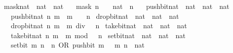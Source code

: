 \begin{isabellebody}
\isanewline
{}\isamarkupfalse%
\ mask{\isacharunderscore}{\kern0pt}nat\ {\isacharcolon}{\kern0pt}{\isacharcolon}{\kern0pt}\ {\isacartoucheopen}nat\ {\isasymRightarrow}\ nat{\isacartoucheclose}\isanewline
\ \ \ {\isacartoucheopen}mask\ n\ {\isacharequal}{\kern0pt}\ {\isacharparenleft}{\kern0pt}{}\ {\isacharcolon}{\kern0pt}{\isacharcolon}{\kern0pt}\ nat{\isacharparenright}{\kern0pt}\ {\isacharcircum}{\kern0pt}\ n\ {\isacharminus}{\kern0pt}\ {}{\isacartoucheclose}\isanewline
\isanewline
{}\isamarkupfalse%
\ push{\isacharunderscore}{\kern0pt}bit{\isacharunderscore}{\kern0pt}nat\ {\isacharcolon}{\kern0pt}{\isacharcolon}{\kern0pt}\ {\isacartoucheopen}nat\ {\isasymRightarrow}\ nat\ {\isasymRightarrow}\ nat{\isacartoucheclose}\isanewline
\ \ \ {\isacartoucheopen}push{\isacharunderscore}{\kern0pt}bit{\isacharunderscore}{\kern0pt}nat\ n\ m\ {\isacharequal}{\kern0pt}\ m\ {\isacharasterisk}{\kern0pt}\ {}\ {\isacharcircum}{\kern0pt}\ n{\isacartoucheclose}\isanewline
\isanewline
{}\isamarkupfalse%
\ drop{\isacharunderscore}{\kern0pt}bit{\isacharunderscore}{\kern0pt}nat\ {\isacharcolon}{\kern0pt}{\isacharcolon}{\kern0pt}\ {\isacartoucheopen}nat\ {\isasymRightarrow}\ nat\ {\isasymRightarrow}\ nat{\isacartoucheclose}\isanewline
\ \ \ {\isacartoucheopen}drop{\isacharunderscore}{\kern0pt}bit{\isacharunderscore}{\kern0pt}nat\ n\ m\ {\isacharequal}{\kern0pt}\ m\ div\ {}\ {\isacharcircum}{\kern0pt}\ n{\isacartoucheclose}\isanewline
\isanewline
{}\isamarkupfalse%
\ take{\isacharunderscore}{\kern0pt}bit{\isacharunderscore}{\kern0pt}nat\ {\isacharcolon}{\kern0pt}{\isacharcolon}{\kern0pt}\ {\isacartoucheopen}nat\ {\isasymRightarrow}\ nat\ {\isasymRightarrow}\ nat{\isacartoucheclose}\isanewline
\ \ \ {\isacartoucheopen}take{\isacharunderscore}{\kern0pt}bit{\isacharunderscore}{\kern0pt}nat\ n\ m\ {\isacharequal}{\kern0pt}\ m\ mod\ {}\ {\isacharcircum}{\kern0pt}\ n{\isacartoucheclose}\isanewline
\isanewline
{}\isamarkupfalse%
\ set{\isacharunderscore}{\kern0pt}bit{\isacharunderscore}{\kern0pt}nat\ {\isacharcolon}{\kern0pt}{\isacharcolon}{\kern0pt}\ {\isacartoucheopen}nat\ {\isasymRightarrow}\ nat\ {\isasymRightarrow}\ nat{\isacartoucheclose}\isanewline
\ \ \ {\isacartoucheopen}set{\isacharunderscore}{\kern0pt}bit\ m\ n\ {\isacharequal}{\kern0pt}\ n\ OR\ push{\isacharunderscore}{\kern0pt}bit\ m\ {}{\isacartoucheclose}\ \ m\ n\ {\isacharcolon}{\kern0pt}{\isacharcolon}{\kern0pt}\ nat\isanewline

\end{isabellebody}
